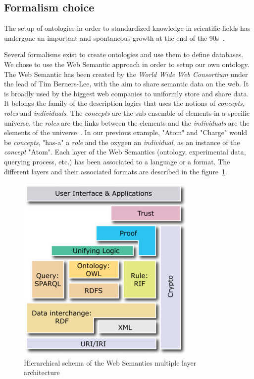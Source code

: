 \documentclass{vgtc}                          %
\begin{document}
\subsection{Formalism choice}

The setup of ontologies in order to standardized knowledge in scientific fields has undergone an important and spontaneous growth at the end of the 90s~\cite{schulze-kremer_ontologies_2002, baker_ontology_1999}.

Several formalisms exist to create ontologies and use them to define databases. We chose to use the Web Semantic approach in order to setup our own ontology. 
The Web Semantic has been created by the \textit{World Wide Web Consortium} under the lead of Tim Berners-Lee, with the aim to share semantic data on the web. It is broadly used by the biggest web companies to uniformly store and share data. It belongs the family of the description logics that uses the notions of \textit{concepts, roles} and \textit{individuals}. The \textit{concepts} are the sub-ensemble of elements in a specific universe, the \textit{roles} are the links between the elements and the \textit{individuals} are the elements of the universe~\cite{}. In our previous example, "Atom" and "Charge" would be \textit{concepts}, "has-a" a \textit{role} and the oxygen an \textit{individual}, as an instance of the \textit{concept} "Atom".
Each layer of the Web Semantics (ontology, experimental data, querying process, etc.) has been associated to a language or a format. The different layers and their associated formats are described in the figure~\ref{web_semantic_hierarchy}. 

\begin{figure}[htb]
  \centering
  \includegraphics[width=.5\linewidth]{figures/web_semantic_hierarchy.png}
  \caption{Hierarchical schema of the Web Semantics multiple layer architecture}
  \label{web_semantic_hierarchy}
\end{figure}
\end{document}
